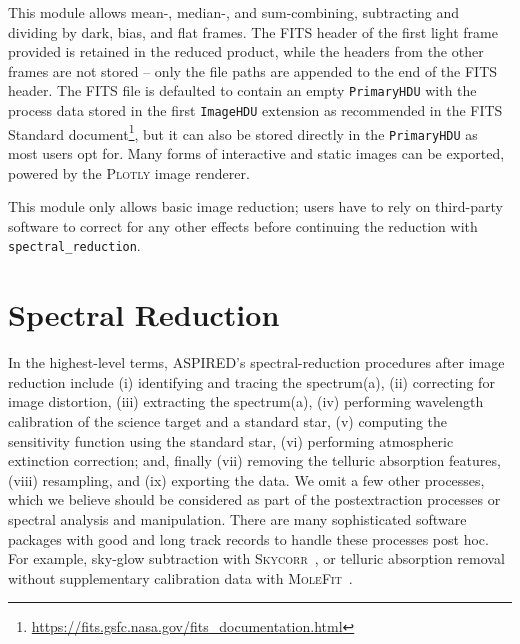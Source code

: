 \documentclass[linenumbers, twocolumn]{aastex631}
\begin{document}
This module allows mean-, median-, and sum-combining, subtracting and dividing
by dark, bias, and flat frames. The FITS header of the first
light frame provided is retained in the reduced product, while the headers
from the other frames are not stored -- only the file paths are appended to
the end of the FITS header. The FITS file is defaulted to contain an empty
\texttt{PrimaryHDU} with the process data stored in the first
\texttt{ImageHDU} extension as recommended in the FITS Standard 
document\footnote{\url{https://fits.gsfc.nasa.gov/fits_documentation.html}},
but it can also be stored directly in the \texttt{PrimaryHDU} as most users
opt for. Many forms of interactive and static images can be exported,
powered by the \textsc{Plotly} image renderer.

This module only allows basic image reduction; users have to rely on third-party
software to correct for any other effects before continuing the
reduction with \texttt{spectral\_reduction}.

\section{Spectral Reduction}
\label{sec:spectral_reduction}

In the highest-level terms, \textsc{ASPIRED}'s spectral-reduction procedures
after image reduction include (i) identifying and tracing the spectrum(a),
(ii) correcting for image distortion, (iii) extracting the spectrum(a),
(iv) performing wavelength calibration of the science target and a standard
star, (v) computing the sensitivity function using the standard star,
(vi) performing atmospheric extinction correction; and, finally (vii) removing
the telluric absorption features, (viii) resampling, and (ix) exporting the data.
We omit a few other processes, which we believe should be considered as part of
the postextraction processes or spectral analysis and manipulation. There are
many sophisticated software packages with good and long track records to
handle these processes post hoc. For example, sky-glow subtraction with
\textsc{Skycorr}~\citep{2014A&A...567A..25N}, or telluric
absorption removal without supplementary calibration data with
\textsc{MoleFit}~\citep{2015A&A...576A..77S, 2015A&A...576A..78K}.
\end{document}

